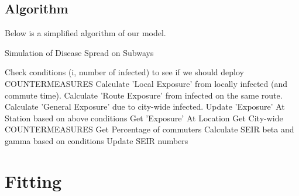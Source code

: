 \documentclass[12pt, a4, epsf] {article}
\theoremstyle{plain}
\theoremstyle{definition}
\begin{document}
\subsection{Algorithm}
Below is a simplified algorithm of our model.
\begin{algorithm}
\caption{Simulation of Disease Spread on Subways}\label{euclid}
\begin{algorithmic}[1]
    Check conditions (i, number of infected) to see if we should deploy COUNTERMEASURES
        \State Calculate 'Local Exposure' from locally infected (and commute time).
        \State Calculate 'Route Exposure' from infected on the same route.
        \State Calculate 'General Exposure' due to city-wide infected.
        \State Update 'Exposure' At Station based on above conditions
    \EndFor
        \State Get 'Exposure' At Location
        \State Get City-wide COUNTERMEASURES
        \State Get Percentage of commuters
        \State Calculate SEIR beta and gamma based on conditions
        \State Update SEIR numbers
    \EndFor
\EndFor
\end{algorithmic}
\end{algorithm}
\section{Fitting}
\end{document}
